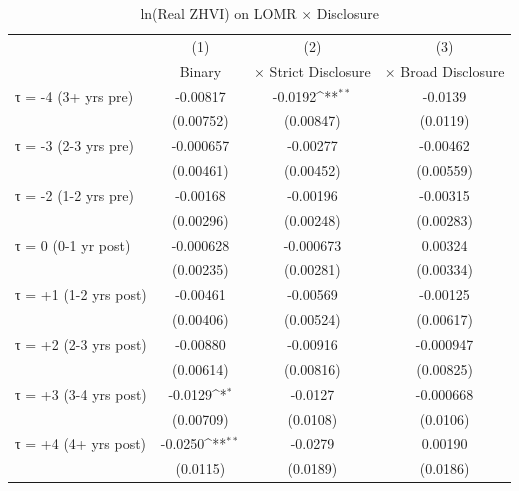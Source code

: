 \begin{table}[htbp]\centering
\def\sym#1{\ifmmode^{#1}\else\(^{#1}\)\fi}
\caption{ln(Real ZHVI) on LOMR × Disclosure}
\begin{tabular}{l*{3}{c}}
\hline\hline
                    &\multicolumn{1}{c}{(1)}&\multicolumn{1}{c}{(2)}&\multicolumn{1}{c}{(3)}\\
                    &\multicolumn{1}{c}{Binary}&\multicolumn{1}{c}{× Strict Disclosure}&\multicolumn{1}{c}{× Broad Disclosure}\\
\hline
τ = -4 (3+ yrs pre) &    -0.00817         &     -0.0192\sym{**} &     -0.0139         \\
                    &   (0.00752)         &   (0.00847)         &    (0.0119)         \\
[1em]
τ = -3 (2-3 yrs pre)&   -0.000657         &    -0.00277         &    -0.00462         \\
                    &   (0.00461)         &   (0.00452)         &   (0.00559)         \\
[1em]
τ = -2 (1-2 yrs pre)&    -0.00168         &    -0.00196         &    -0.00315         \\
                    &   (0.00296)         &   (0.00248)         &   (0.00283)         \\
[1em]
τ = 0 (0-1 yr post) &   -0.000628         &   -0.000673         &     0.00324         \\
                    &   (0.00235)         &   (0.00281)         &   (0.00334)         \\
[1em]
τ = +1 (1-2 yrs post)&    -0.00461         &    -0.00569         &    -0.00125         \\
                    &   (0.00406)         &   (0.00524)         &   (0.00617)         \\
[1em]
τ = +2 (2-3 yrs post)&    -0.00880         &    -0.00916         &   -0.000947         \\
                    &   (0.00614)         &   (0.00816)         &   (0.00825)         \\
[1em]
τ = +3 (3-4 yrs post)&     -0.0129\sym{*}  &     -0.0127         &   -0.000668         \\
                    &   (0.00709)         &    (0.0108)         &    (0.0106)         \\
[1em]
τ = +4 (4+ yrs post)&     -0.0250\sym{**} &     -0.0279         &     0.00190         \\
                    &    (0.0115)         &    (0.0189)         &    (0.0186)         \\

\end{tabular}
\end{table}
